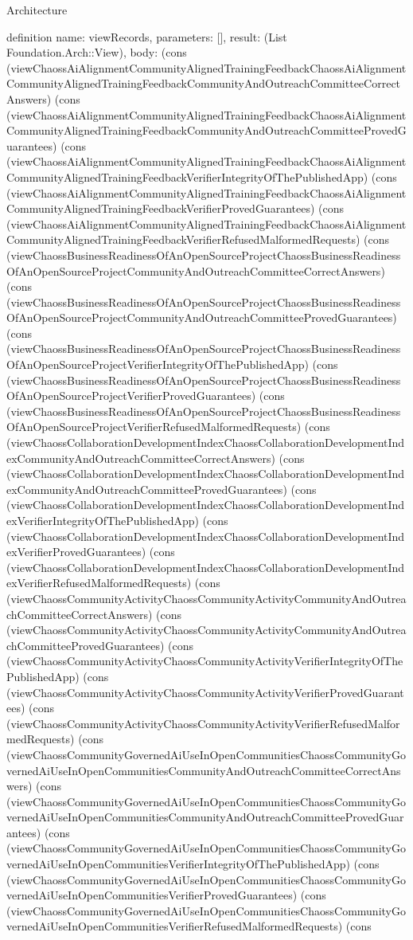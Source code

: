 \begin{lexlean}{Architecture}
\begin{semanticmodule}
definition{
  name: viewRecords,
  parameters: [],
  result: (List Foundation.Arch::View),
  body: (cons (viewChaossAiAlignmentCommunityAlignedTrainingFeedbackChaossAiAlignmentCommunityAlignedTrainingFeedbackCommunityAndOutreachCommitteeCorrectAnswers) (cons (viewChaossAiAlignmentCommunityAlignedTrainingFeedbackChaossAiAlignmentCommunityAlignedTrainingFeedbackCommunityAndOutreachCommitteeProvedGuarantees) (cons (viewChaossAiAlignmentCommunityAlignedTrainingFeedbackChaossAiAlignmentCommunityAlignedTrainingFeedbackVerifierIntegrityOfThePublishedApp) (cons (viewChaossAiAlignmentCommunityAlignedTrainingFeedbackChaossAiAlignmentCommunityAlignedTrainingFeedbackVerifierProvedGuarantees) (cons (viewChaossAiAlignmentCommunityAlignedTrainingFeedbackChaossAiAlignmentCommunityAlignedTrainingFeedbackVerifierRefusedMalformedRequests) (cons (viewChaossBusinessReadinessOfAnOpenSourceProjectChaossBusinessReadinessOfAnOpenSourceProjectCommunityAndOutreachCommitteeCorrectAnswers) (cons (viewChaossBusinessReadinessOfAnOpenSourceProjectChaossBusinessReadinessOfAnOpenSourceProjectCommunityAndOutreachCommitteeProvedGuarantees) (cons (viewChaossBusinessReadinessOfAnOpenSourceProjectChaossBusinessReadinessOfAnOpenSourceProjectVerifierIntegrityOfThePublishedApp) (cons (viewChaossBusinessReadinessOfAnOpenSourceProjectChaossBusinessReadinessOfAnOpenSourceProjectVerifierProvedGuarantees) (cons (viewChaossBusinessReadinessOfAnOpenSourceProjectChaossBusinessReadinessOfAnOpenSourceProjectVerifierRefusedMalformedRequests) (cons (viewChaossCollaborationDevelopmentIndexChaossCollaborationDevelopmentIndexCommunityAndOutreachCommitteeCorrectAnswers) (cons (viewChaossCollaborationDevelopmentIndexChaossCollaborationDevelopmentIndexCommunityAndOutreachCommitteeProvedGuarantees) (cons (viewChaossCollaborationDevelopmentIndexChaossCollaborationDevelopmentIndexVerifierIntegrityOfThePublishedApp) (cons (viewChaossCollaborationDevelopmentIndexChaossCollaborationDevelopmentIndexVerifierProvedGuarantees) (cons (viewChaossCollaborationDevelopmentIndexChaossCollaborationDevelopmentIndexVerifierRefusedMalformedRequests) (cons (viewChaossCommunityActivityChaossCommunityActivityCommunityAndOutreachCommitteeCorrectAnswers) (cons (viewChaossCommunityActivityChaossCommunityActivityCommunityAndOutreachCommitteeProvedGuarantees) (cons (viewChaossCommunityActivityChaossCommunityActivityVerifierIntegrityOfThePublishedApp) (cons (viewChaossCommunityActivityChaossCommunityActivityVerifierProvedGuarantees) (cons (viewChaossCommunityActivityChaossCommunityActivityVerifierRefusedMalformedRequests) (cons (viewChaossCommunityGovernedAiUseInOpenCommunitiesChaossCommunityGovernedAiUseInOpenCommunitiesCommunityAndOutreachCommitteeCorrectAnswers) (cons (viewChaossCommunityGovernedAiUseInOpenCommunitiesChaossCommunityGovernedAiUseInOpenCommunitiesCommunityAndOutreachCommitteeProvedGuarantees) (cons (viewChaossCommunityGovernedAiUseInOpenCommunitiesChaossCommunityGovernedAiUseInOpenCommunitiesVerifierIntegrityOfThePublishedApp) (cons (viewChaossCommunityGovernedAiUseInOpenCommunitiesChaossCommunityGovernedAiUseInOpenCommunitiesVerifierProvedGuarantees) (cons (viewChaossCommunityGovernedAiUseInOpenCommunitiesChaossCommunityGovernedAiUseInOpenCommunitiesVerifierRefusedMalformedRequests) (cons }
\end{semanticmodule}
\end{lexlean}
